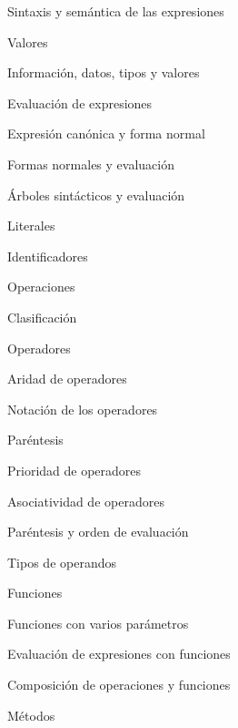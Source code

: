 \begin{longenum}
\begin{longenum}
\begin{longenum}
            \item Sintaxis y semántica de las expresiones
        \end{longenum}
        \item Valores
        \begin{longenum}
            \item Información, datos, tipos y valores
            \item Evaluación de expresiones
            \item Expresión canónica y forma normal
            \item Formas normales y evaluación
            \item Árboles sintácticos y evaluación
            \item Literales
            \item Identificadores
        \end{longenum}
        \item Operaciones
        \begin{longenum}
            \item Clasificación
            \item Operadores
            \begin{longenum}
                \item Aridad de operadores
                \item Notación de los operadores
                \item Paréntesis
                \item Prioridad de operadores
                \item Asociatividad de operadores
                \item Paréntesis y orden de evaluación
                \item Tipos de operandos
            \end{longenum}
            \item Funciones
            \begin{longenum}
                \item Funciones con varios parámetros
                \item Evaluación de expresiones con funciones
                \item Composición de operaciones y funciones
            \end{longenum}
            \item Métodos
        \end{longenum}
    \end{longenum}

\end{longenum}
